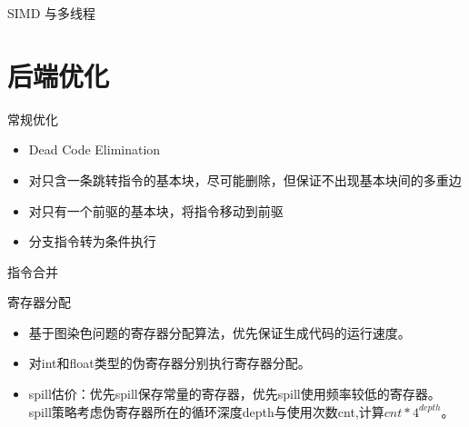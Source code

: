 \documentclass[aspectratio=169,UTF-8]{ctexbeamer}
\begin{document}
		\begin{frame}{SIMD 与多线程}
			
		\end{frame}
	
	\section{后端优化}
	
		\begin{frame}{常规优化}
			\begin{itemize}
				\item Dead Code Elimination
				\item 对只含一条跳转指令的基本块，尽可能删除，但保证不出现基本块间的多重边
				\item 对只有一个前驱的基本块，将指令移动到前驱
				\item 分支指令转为条件执行
			\end{itemize}
		\end{frame}
		
		\begin{frame}{指令合并}
			
		\end{frame}
		
		\begin{frame}{寄存器分配}
			\begin{itemize}
				\item 基于图染色问题的寄存器分配算法，优先保证生成代码的运行速度。
				\item 对int和float类型的伪寄存器分别执行寄存器分配。
				\item spill估价：优先spill保存常量的寄存器，优先spill使用频率较低的寄存器。
				spill策略考虑伪寄存器所在的循环深度depth与使用次数cnt,计算$cnt * 4^{depth}$。
				\end{itemize}
		\end{frame}
	
\end{document}
